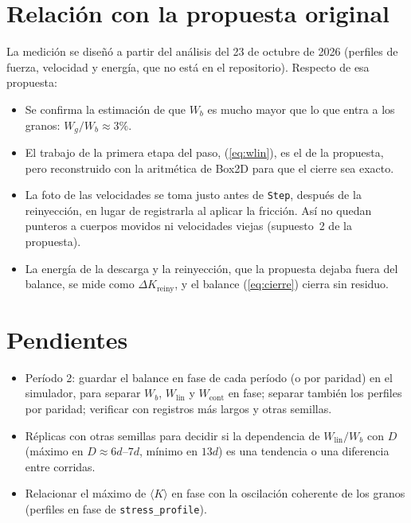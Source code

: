 \documentclass[11pt,a4paper]{article}
\newcommand{\code}[1]{\texttt{#1}}
\newcommand{\ave}[1]{\langle #1 \rangle}
\newcommand{\Wb}{W_b}
\newcommand{\Wlin}{W_\text{lin}}
\newcommand{\Wg}{W_g}
\newcommand{\Wcont}{W_\text{cont}}
\newcommand{\dKr}{\Delta K_\text{reiny}}
\begin{document}
\section{Relación con la propuesta original}

La medición se diseñó a partir del análisis del 23 de octubre de 2026
(perfiles de fuerza, velocidad y energía, que no está en el repositorio).
Respecto de esa propuesta:
\begin{itemize}
  \item Se confirma la estimación de que $\Wb$ es mucho mayor que lo que
    entra a los granos: $\Wg/\Wb \approx 3\%$.
  \item El trabajo de la primera etapa del paso, (\ref{eq:wlin}), es el de
    la propuesta, pero reconstruido con la aritmética de Box2D para que el
    cierre sea exacto.
  \item La foto de las velocidades se toma justo antes de \code{Step},
    después de la reinyección, en lugar de registrarla al aplicar la
    fricción. Así no quedan punteros a cuerpos movidos ni velocidades
    viejas (supuesto~2 de la propuesta).
  \item La energía de la descarga y la reinyección, que la propuesta
    dejaba fuera del balance, se mide como $\dKr$, y el balance
    (\ref{eq:cierre}) cierra sin residuo.
\end{itemize}

\section{Pendientes}

\begin{itemize}
  \item Período 2: guardar el balance en fase de cada período (o por
    paridad) en el simulador, para separar $\Wb$, $\Wlin$ y $\Wcont$ en
    fase; separar también los perfiles por paridad; verificar con registros
    más largos y otras semillas.
  \item Réplicas con otras semillas para decidir si la dependencia de
    $\Wlin/\Wb$ con $D$ (máximo en $D \approx 6d$--$7d$, mínimo en $13d$)
    es una tendencia o una diferencia entre corridas.
  \item Relacionar el máximo de $\ave{K}$ en fase con la oscilación
    coherente de los granos (perfiles en fase de \code{stress\_profile}).
\end{itemize}
\end{document}
